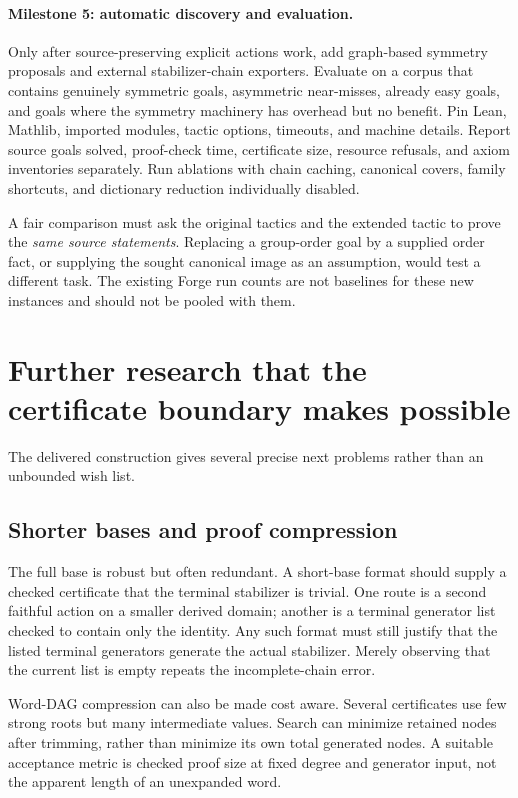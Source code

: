 \paragraph{Milestone 5: automatic discovery and evaluation.}
Only after source-preserving explicit actions work, add graph-based symmetry proposals and external stabilizer-chain exporters. Evaluate on a corpus that contains genuinely symmetric goals, asymmetric near-misses, already easy  goals, and goals where the symmetry machinery has overhead but no benefit. Pin Lean, Mathlib, imported modules, tactic options, timeouts, and machine details. Report source goals solved, proof-check time, certificate size, resource refusals, and axiom inventories separately. Run ablations with chain caching, canonical covers, family shortcuts, and dictionary reduction individually disabled.

A fair comparison must ask the original tactics and the extended tactic to prove the \emph{same source statements}. Replacing a group-order goal by a supplied order fact, or supplying the sought canonical image as an assumption, would test a different task. The existing Forge run counts are not baselines for these new instances and should not be pooled with them.

\section{Further research that the certificate boundary makes possible}
The delivered construction gives several precise next problems rather than an unbounded wish list.

\subsection{Shorter bases and proof compression}
The full base is robust but often redundant. A short-base format should supply a checked certificate that the terminal stabilizer is trivial. One route is a second faithful action on a smaller derived domain; another is a terminal generator list checked to contain only the identity. Any such format must still justify that the listed terminal generators generate the actual stabilizer. Merely observing that the current list is empty repeats the incomplete-chain error.

Word-DAG compression can also be made cost aware. Several certificates use few strong roots but many intermediate values. Search can minimize retained nodes after trimming, rather than minimize its own total generated nodes. A suitable acceptance metric is checked proof size at fixed degree and generator input, not the apparent length of an unexpanded word.

